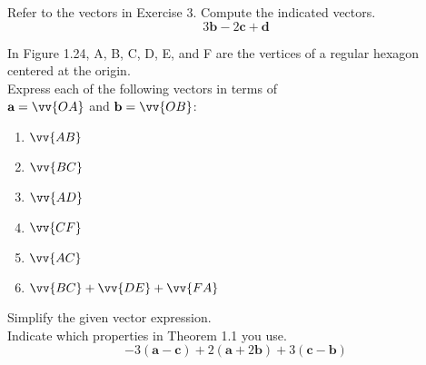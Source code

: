 \documentclass[11pt,letterpaper,boxed]{hmcpset}
\begin{document}
\begin{problem}[\#12] 
Refer to the vectors in Exercise 3. Compute the indicated vectors.\\
\[
3\textbf{b}-2\textbf{c}+\textbf{d}
\]
\end{problem}



\pagebreak


\begin{problem}[\#14] 
In Figure 1.24, A, B, C, D, E, and F are the vertices of a regular hexagon centered at the origin.\\
Express each of the following vectors in terms of\\
$\textbf{a}=\vv{OA}$ and $\textbf{b}=\vv{OB}$:
\begin{enumerate}
\item $\vv{AB}$
\item $\vv{BC}$
\item $\vv{AD}$
\item $\vv{CF}$
\item $\vv{AC}$
\item $\vv{BC}+\vv{DE}+\vv{FA}$
\end{enumerate}
\end{problem}



\pagebreak


\begin{problem}[\#16] 
Simplify the given vector expression.\\
Indicate which properties in Theorem 1.1 you use.\\
\[
-3(\textbf{a}-\textbf{c})+2(\textbf{a}+2\textbf{b})+3(\textbf{c}-\textbf{b})
\]
\end{problem}


\end{document}
